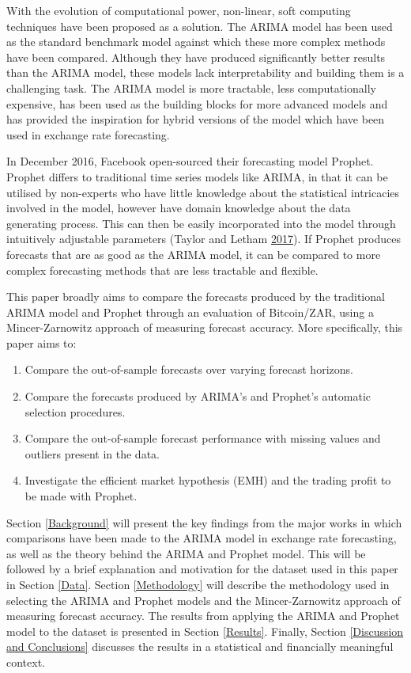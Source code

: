 \documentclass[12pt,preprint, authoryear]{elsarticle}
\numberwithin{equation}{section}
\numberwithin{figure}{section}
\numberwithin{table}{section}
\begin{document}
With the evolution of computational power, non-linear, soft computing
techniques have been proposed as a solution. The ARIMA model has been
used as the standard benchmark model against which these more complex
methods have been compared. Although they have produced significantly
better results than the ARIMA model, these models lack interpretability
and building them is a challenging task. The ARIMA model is more
tractable, less computationally expensive, has been used as the building
blocks for more advanced models and has provided the inspiration for
hybrid versions of the model which have been used in exchange rate
forecasting.

In December 2016, Facebook open-sourced their forecasting model Prophet.
Prophet differs to traditional time series models like ARIMA, in that it
can be utilised by non-experts who have little knowledge about the
statistical intricacies involved in the model, however have domain
knowledge about the data generating process. This can then be easily
incorporated into the model through intuitively adjustable parameters
(Taylor and Letham \protect\hyperlink{ref-taylor2017}{2017}). If Prophet
produces forecasts that are as good as the ARIMA model, it can be
compared to more complex forecasting methods that are less tractable and
flexible.

This paper broadly aims to compare the forecasts produced by the
traditional ARIMA model and Prophet through an evaluation of
Bitcoin/ZAR, using a Mincer-Zarnowitz approach of measuring forecast
accuracy. More specifically, this paper aims to:

\begin{enumerate}
\def\labelenumi{\arabic{enumi})}
\item
  Compare the out-of-sample forecasts over varying forecast horizons.
\item
  Compare the forecasts produced by ARIMA's and Prophet's automatic
  selection procedures.
\item
  Compare the out-of-sample forecast performance with missing values and
  outliers present in the data.
\item
  Investigate the efficient market hypothesis (EMH) and the trading
  profit to be made with Prophet.
\end{enumerate}

Section \ref{Background} will present the key findings from the major
works in which comparisons have been made to the ARIMA model in exchange
rate forecasting, as well as the theory behind the ARIMA and Prophet
model. This will be followed by a brief explanation and motivation for
the dataset used in this paper in Section \ref{Data}. Section
\ref{Methodology} will describe the methodology used in selecting the
ARIMA and Prophet models and the Mincer-Zarnowitz approach of measuring
forecast accuracy. The results from applying the ARIMA and Prophet model
to the dataset is presented in Section \ref{Results}. Finally, Section
\ref{Discussion and Conclusions} discusses the results in a statistical
and financially meaningful context.
\end{document}
